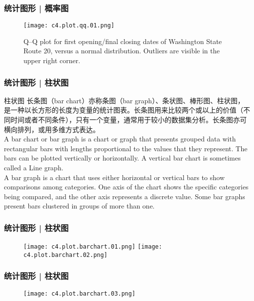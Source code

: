 \begin{frame}
  \frametitle{统计图形 | 概率图}
  \begin{figure}
    \centering
    \texttt{[image: c4.plot.qq.01.png]}
    \caption{Q–Q plot for first opening/final closing dates of Washington State Route 20, versus a normal distribution. Outliers are visible in the upper right corner.}
  \end{figure}
\end{frame}

\begin{frame}
  \frametitle{统计图形 | 柱状图}
  \begin{block}{柱状图}
    长条图（bar chart）亦称条图（bar graph）、条状图、棒形图、柱状图，是一种以长方形的长度为变量的统计图表。长条图用来比较两个或以上的价值（不同时间或者不同条件），只有一个变量，通常用于较小的数据集分析。长条图亦可横向排列，或用多维方式表达。\\
\vspace{0.5em}
A bar chart or bar graph is a chart or graph that presents grouped data with rectangular bars with lengths proportional to the values that they represent. The bars can be plotted vertically or horizontally. A vertical bar chart is sometimes called a Line graph.\\
\vspace{0.5em}
A bar graph is a chart that uses either horizontal or vertical bars to show comparisons among categories. One axis of the chart shows the specific categories being compared, and the other axis represents a discrete value. Some bar graphs present bars clustered in groups of more than one.
  \end{block}
\end{frame}

\begin{frame}
  \frametitle{统计图形 | 柱状图}
  \begin{figure}
    \centering
    \texttt{[image: c4.plot.barchart.01.png]}
    \texttt{[image: c4.plot.barchart.02.png]}
  \end{figure}
\end{frame}

\begin{frame}
  \frametitle{统计图形 | 柱状图}
  \begin{figure}
    \centering
    \texttt{[image: c4.plot.barchart.03.png]}
  \end{figure}
\end{frame}


